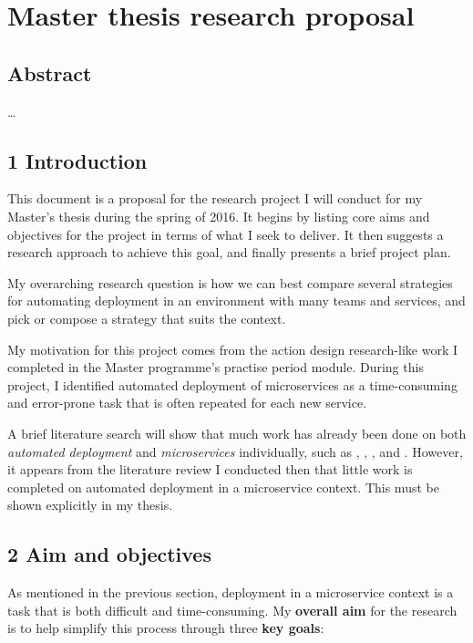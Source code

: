\section{Master thesis research
proposal}\label{master-thesis-research-proposal}

\subsection{Abstract}\label{abstract}

\ldots{}

\subsection{1 Introduction}\label{introduction}

This document is a proposal for the research project I will conduct for
my Master's thesis during the spring of 2016. It begins by listing core
aims and objectives for the project in terms of what I seek to deliver.
It then suggests a research approach to achieve this goal, and finally
presents a brief project plan.

My overarching research question is how we can best compare several
strategies for automating deployment in an environment with many teams
and services, and pick or compose a strategy that suits the context.

My motivation for this project comes from the action design
research-like work I completed in the Master programme's practise period
module. During this project, I identified automated deployment of
microservices as a time-consuming and error-prone task that is often
repeated for each new service.

A brief literature search will show that much work has already been done
on both \emph{automated deployment} and \emph{microservices}
individually, such as \autocite{virmani:2015}, \autocite{stolberg},
\autocite{savchenko:2015}, and \autocite{le:2015}. However, it appears
from the literature review I conducted then that little work is
completed on automated deployment in a microservice context. This must
be shown explicitly in my thesis.

\subsection{2 Aim and objectives}\label{aim-and-objectives}

As mentioned in the previous section, deployment in a microservice
context is a task that is both difficult and time-consuming. My
\textbf{overall aim} for the research is to help simplify this process
through three \textbf{key goals}:

